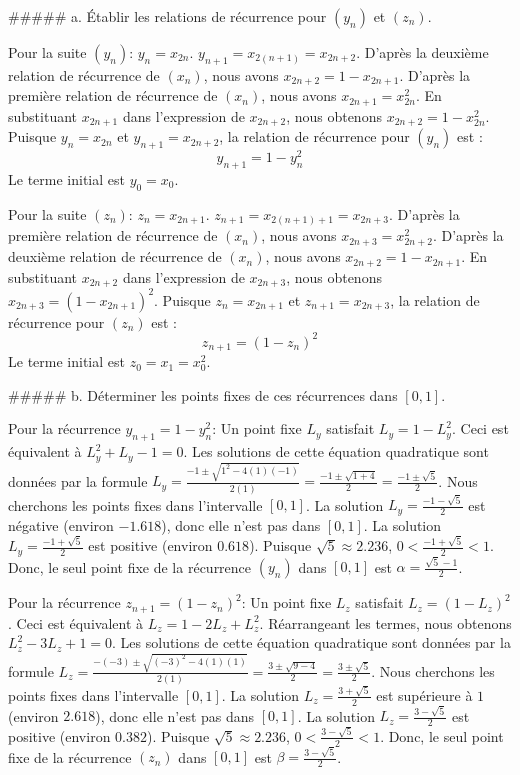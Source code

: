 \documentclass{report}
\begin{document}
##### a. Établir les relations de récurrence pour $(y_n)$ et $(z_n)$.

Pour la suite $(y_n)$:
$y_n = x_{2n}$.
$y_{n+1} = x_{2(n+1)} = x_{2n+2}$.
D'après la deuxième relation de récurrence de $(x_n)$, nous avons $x_{2n+2} = 1 - x_{2n+1}$.
D'après la première relation de récurrence de $(x_n)$, nous avons $x_{2n+1} = x_{2n}^2$.
En substituant $x_{2n+1}$ dans l'expression de $x_{2n+2}$, nous obtenons $x_{2n+2} = 1 - x_{2n}^2$.
Puisque $y_n = x_{2n}$ et $y_{n+1} = x_{2n+2}$, la relation de récurrence pour $(y_n)$ est :
$$y_{n+1} = 1 - y_n^2$$
Le terme initial est $y_0 = x_0$.

Pour la suite $(z_n)$:
$z_n = x_{2n+1}$.
$z_{n+1} = x_{2(n+1)+1} = x_{2n+3}$.
D'après la première relation de récurrence de $(x_n)$, nous avons $x_{2n+3} = x_{2n+2}^2$.
D'après la deuxième relation de récurrence de $(x_n)$, nous avons $x_{2n+2} = 1 - x_{2n+1}$.
En substituant $x_{2n+2}$ dans l'expression de $x_{2n+3}$, nous obtenons $x_{2n+3} = (1 - x_{2n+1})^2$.
Puisque $z_n = x_{2n+1}$ et $z_{n+1} = x_{2n+3}$, la relation de récurrence pour $(z_n)$ est :
$$z_{n+1} = (1 - z_n)^2$$
Le terme initial est $z_0 = x_1 = x_0^2$.

##### b. Déterminer les points fixes de ces récurrences dans $[0,1]$.

Pour la récurrence $y_{n+1} = 1 - y_n^2$:
Un point fixe $L_y$ satisfait $L_y = 1 - L_y^2$.
Ceci est équivalent à $L_y^2 + L_y - 1 = 0$.
Les solutions de cette équation quadratique sont données par la formule $L_y = \frac{-1 \pm \sqrt{1^2 - 4(1)(-1)}}{2(1)} = \frac{-1 \pm \sqrt{1+4}}{2} = \frac{-1 \pm \sqrt{5}}{2}$.
Nous cherchons les points fixes dans l'intervalle $[0,1]$.
La solution $L_y = \frac{-1 - \sqrt{5}}{2}$ est négative (environ $-1.618$), donc elle n'est pas dans $[0,1]$.
La solution $L_y = \frac{-1 + \sqrt{5}}{2}$ est positive (environ $0.618$). Puisque $\sqrt{5} \approx 2.236$, $0 < \frac{-1 + \sqrt{5}}{2} < 1$.
Donc, le seul point fixe de la récurrence $(y_n)$ dans $[0,1]$ est $\alpha = \frac{\sqrt{5}-1}{2}$.

Pour la récurrence $z_{n+1} = (1 - z_n)^2$:
Un point fixe $L_z$ satisfait $L_z = (1 - L_z)^2$.
Ceci est équivalent à $L_z = 1 - 2L_z + L_z^2$.
Réarrangeant les termes, nous obtenons $L_z^2 - 3L_z + 1 = 0$.
Les solutions de cette équation quadratique sont données par la formule $L_z = \frac{-(-3) \pm \sqrt{(-3)^2 - 4(1)(1)}}{2(1)} = \frac{3 \pm \sqrt{9-4}}{2} = \frac{3 \pm \sqrt{5}}{2}$.
Nous cherchons les points fixes dans l'intervalle $[0,1]$.
La solution $L_z = \frac{3 + \sqrt{5}}{2}$ est supérieure à $1$ (environ $2.618$), donc elle n'est pas dans $[0,1]$.
La solution $L_z = \frac{3 - \sqrt{5}}{2}$ est positive (environ $0.382$). Puisque $\sqrt{5} \approx 2.236$, $0 < \frac{3 - \sqrt{5}}{2} < 1$.
Donc, le seul point fixe de la récurrence $(z_n)$ dans $[0,1]$ est $\beta = \frac{3-\sqrt{5}}{2}$.
\end{document}
